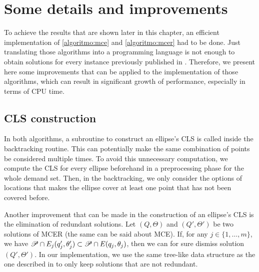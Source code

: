 


\section{Some details and improvements}\label{section:improvements}

To achieve the results that are shown later in this chapter, an efficient implementation of \autoref{algoritmo:mce} and \autoref{algoritmo:mcer} had to be done. Just translating those algorithms into a programming language is not enough to obtain solutions for every instance previously published in .
Therefore, we present here some improvements that can be applied to the implementation of those algorithms, which can result in significant growth of performance, especially in terms of CPU time.

\subsection{CLS construction}

In both algorithms, a subroutine to construct an ellipse's CLS is called inside the backtracking routine. This can potentially make the same combination of points be considered multiple times.
To avoid this unnecessary computation, we compute the CLS for every ellipse beforehand in a preprocessing phase for the whole demand set. Then, in the backtracking, we only consider the options of locations that makes the ellipse cover at least one point that has not been covered before.

Another improvement that can be made in the construction of an ellipse's CLS is the elimination of redundant solutions.
Let $(Q, \Theta)$ and $(Q', \Theta')$ be two solutions of MCER (the same can be said about MCE). If, for any $j \in \{1, \dots, m\}$, we have $\mathscr{P} \cap E_j(q_j', \theta_j') \subset \mathscr{P} \cap E(q_j, \theta_j)$, then we can for sure dismiss solution $(Q', \Theta')$.
In our implementation, we use the same tree-like data structure as the one described in  to only keep solutions that are not redundant.

